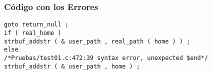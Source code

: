 \documentclass{beamer}
\begin{document}
\begin{frame}[fragile]
\frametitle{C\'odigo con los Errores}
\begin{verbatim}
goto return_null ; 
if ( real_home ) 
strbuf_addstr ( & user_path , real_path ( home ) ) ; 
else 
/*Pruebas/test01.c:472:39 syntax error, unexpected $end*/
strbuf_addstr ( & user_path , home ) ; \end{verbatim}
\end{frame}
\end{document}
